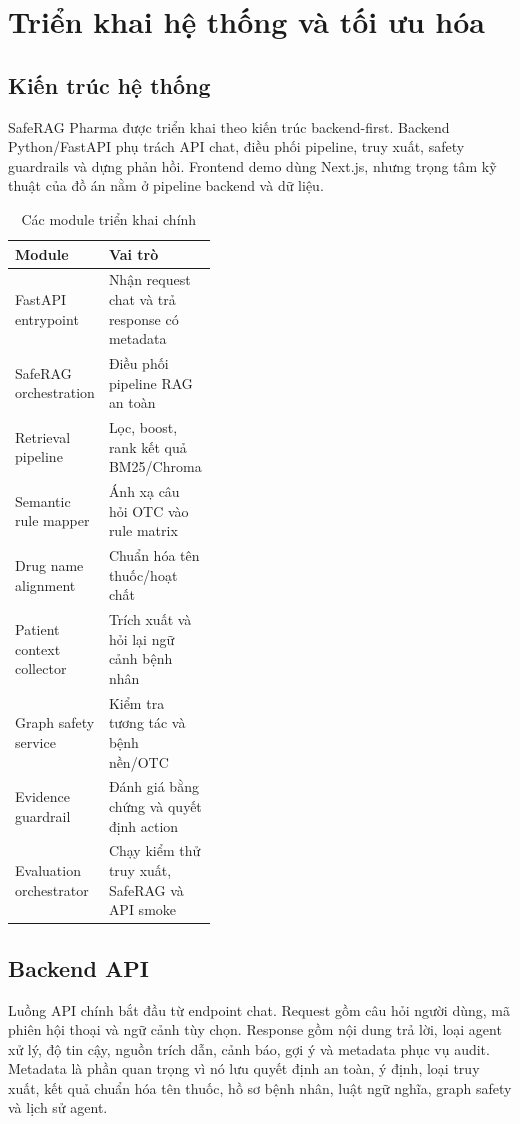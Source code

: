 \chapter{Triển khai hệ thống và tối ưu hóa}

\section{Kiến trúc hệ thống}

SafeRAG Pharma được triển khai theo kiến trúc backend-first. Backend Python/FastAPI phụ trách API chat, điều phối pipeline, truy xuất, safety guardrails và dựng phản hồi. Frontend demo dùng Next.js, nhưng trọng tâm kỹ thuật của đồ án nằm ở pipeline backend và dữ liệu.

\begin{table}[H]
\centering
\footnotesize
\caption{Các module triển khai chính}
\begin{tabularx}{\linewidth}{p{0.40\linewidth} Y}
\toprule
\textbf{Module} & \textbf{Vai trò} \\
\midrule
FastAPI entrypoint & Nhận request chat và trả response có metadata \\
SafeRAG orchestration & Điều phối pipeline RAG an toàn \\
Retrieval pipeline & Lọc, boost, rank kết quả BM25/Chroma \\
Semantic rule mapper & Ánh xạ câu hỏi OTC vào rule matrix \\
Drug name alignment & Chuẩn hóa tên thuốc/hoạt chất \\
Patient context collector & Trích xuất và hỏi lại ngữ cảnh bệnh nhân \\
Graph safety service & Kiểm tra tương tác và bệnh nền/OTC \\
Evidence guardrail & Đánh giá bằng chứng và quyết định action \\
Evaluation orchestrator & Chạy kiểm thử truy xuất, SafeRAG và API smoke \\
\bottomrule
\end{tabularx}
\end{table}

\section{Backend API}

Luồng API chính bắt đầu từ endpoint chat. Request gồm câu hỏi người dùng, mã phiên hội thoại và ngữ cảnh tùy chọn. Response gồm nội dung trả lời, loại agent xử lý, độ tin cậy, nguồn trích dẫn, cảnh báo, gợi ý và metadata phục vụ audit. Metadata là phần quan trọng vì nó lưu quyết định an toàn, ý định, loại truy xuất, kết quả chuẩn hóa tên thuốc, hồ sơ bệnh nhân, luật ngữ nghĩa, graph safety và lịch sử agent.

